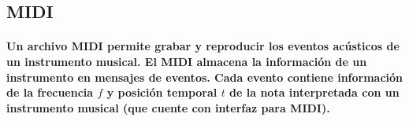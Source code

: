 
\subsection{MIDI}
\paragraph{Un archivo MIDI permite grabar y reproducir los eventos acústicos de un instrumento musical.
El MIDI almacena la información de un instrumento en mensajes
de eventos. Cada evento contiene información de la frecuencia $f$ y posición temporal $t$ de la nota interpretada con un instrumento musical (que cuente con interfaz para MIDI).}
